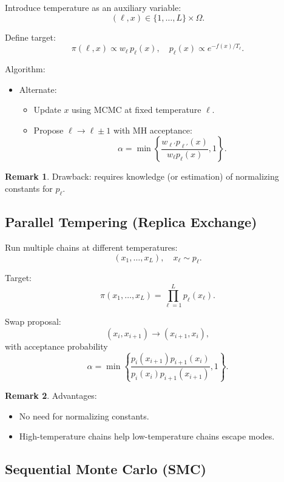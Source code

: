 \documentclass[12pt,oneside]{book}
\numberwithin{equation}{section}
\theoremstyle{definition}
\newtheorem{remark}{Remark}[section]
\theoremstyle{plain}
\theoremstyle{remark}
\begin{document}
Introduce temperature as an auxiliary variable:
\[
(\ell, x) \in \{1,\dots,L\} \times \Omega.
\]

Define target:
\[
\pi(\ell, x) \propto w_\ell\, p_\ell(x), \quad p_\ell(x) \propto e^{-f(x)/T_\ell}.
\]

Algorithm:
\begin{itemize}
    \item Alternate:
    \begin{itemize}
        \item Update $x$ using MCMC at fixed temperature $\ell$.
        \item Propose $\ell \to \ell \pm 1$ with MH acceptance:
        \[
        \alpha = \min\left\{ \frac{w_{\ell'} p_{\ell'}(x)}{w_\ell p_\ell(x)}, 1 \right\}.
        \]
    \end{itemize}
\end{itemize}

\begin{remark}
Drawback: requires knowledge (or estimation) of normalizing constants for $p_\ell$.
\end{remark}

\subsection{Parallel Tempering (Replica Exchange)}

Run multiple chains at different temperatures:
\[
(x_1, \dots, x_L), \quad x_\ell \sim p_\ell.
\]

Target:
\[
\pi(x_1,\dots,x_L) = \prod_{\ell=1}^L p_\ell(x_\ell).
\]

Swap proposal:
\[
(x_i, x_{i+1}) \to (x_{i+1}, x_i),
\]
with acceptance probability
\[
\alpha = \min\left\{ \frac{p_i(x_{i+1}) p_{i+1}(x_i)}{p_i(x_i)p_{i+1}(x_{i+1})}, 1 \right\}.
\]

\begin{remark}
Advantages:
\begin{itemize}
    \item No need for normalizing constants.
    \item High-temperature chains help low-temperature chains escape modes.
\end{itemize}
\end{remark}

\subsection{Sequential Monte Carlo (SMC)}
\end{document}
